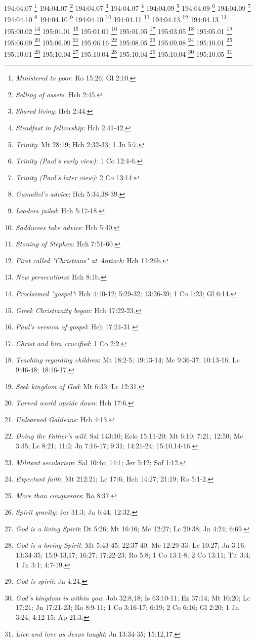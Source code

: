 194:04.07 \footnote{\textit{Ministered to poor}: Ro 15:26; Gl 2:10.}
194:04.07 \footnote{\textit{Selling of assets}: Hch 2:45.}
194:04.07 \footnote{\textit{Shared living}: Hch 2:44.}
194:04.07 \footnote{\textit{Steadfast in fellowship}: Hch 2:41-42.}
194:04.09 \footnote{\textit{Trinity}: Mt 28:19; Hch 2:32-33; 1 Jn 5:7.}
194:04.09 \footnote{\textit{Trinity (Paul's early view)}: 1 Co 12:4-6.}
194:04.09 \footnote{\textit{Trinity (Paul's later view)}: 2 Co 13:14.}
194:04.10 \footnote{\textit{Gamaliel's advice}: Hch 5:34,38-39.}
194:04.10 \footnote{\textit{Leaders jailed}: Hch 5:17-18.}
194:04.10 \footnote{\textit{Sadducees take advice}: Hch 5:40.}
194:04.11 \footnote{\textit{Stoning of Stephen}: Hch 7:51-60.}
194:04.13 \footnote{\textit{First called "Christians" at Antioch}: Hch 11:26b.}
194:04.13 \footnote{\textit{New persecutions}: Hch 8:1b.}
195:00.02 \footnote{\textit{Proclaimed "gospel"}: Hch 4:10-12; 5:29-32; 13:26-39; 1 Co 1:23; Gl 6:14.}
195:01.01 \footnote{\textit{Greek Christianity began}: Hch 17:22-23.}
195:01.01 \footnote{\textit{Paul's version of gospel}: Hch 17:24-31.}
195:01.05 \footnote{\textit{Christ and him crucified}: 1 Co 2:2.}
195:03.05 \footnote{\textit{Teaching regarding children}: Mt 18:2-5; 19:13-14; Mc 9:36-37; 10:13-16; Lc 9:46-48; 18:16-17.}
195:05.01 \footnote{\textit{Seek kingdom of God}: Mt 6:33; Lc 12:31.}
195:06.09 \footnote{\textit{Turned world upside down}: Hch 17:6.}
195:06.09 \footnote{\textit{Unlearned Galileans}: Hch 4:13.}
195:06.16 \footnote{\textit{Doing the Father's will}: Sal 143:10; Eclo 15:11-20; Mt 6:10; 7:21; 12:50; Mc 3:35; Lc 8:21; 11:2; Jn 7:16-17; 9:31; 14:21-24; 15:10,14-16.}
195:08.05 \footnote{\textit{Militant secularism}: Sal 10:4c; 14:1; Jer 5:12; Sof 1:12.}
195:09.08 \footnote{\textit{Expectant faith}: Mt 212:21; Lc 17:6; Hch 14:27; 21:19; Ro 5:1-2.}
195:10.01 \footnote{\textit{More than conquerors}: Ro 8:37.}
195:10.01 \footnote{\textit{Spirit gravity}: Jer 31:3; Jn 6:44; 12:32.}
195:10.04 \footnote{\textit{God is a living Spirit}: Dt 5:26; Mt 16:16; Mc 12:27; Lc 20:38; Jn 4:24; 6:69.}
195:10.04 \footnote{\textit{God is a loving Spirit}: Mt 5:43-45; 22:37-40; Mc 12:29-33; Lc 10:27; Jn 3:16; 13:34-35; 15:9-13,17; 16:27; 17:22-23; Ro 5:8; 1 Co 13:1-8; 2 Co 13:11; Tit 3:4; 1 Jn 3:1; 4:7-19.}
195:10.04 \footnote{\textit{God is spirit}: Jn 4:24.}
195:10.04 \footnote{\textit{God's kingdom is within you}: Job 32:8,18; Is 63:10-11; Ez 37:14; Mt 10:20; Lc 17:21; Jn 17:21-23; Ro 8:9-11; 1 Co 3:16-17; 6:19; 2 Co 6:16; Gl 2:20; 1 Jn 3:24; 4:12-15; Ap 21:3.}
195:10.05 \footnote{\textit{Live and love as Jesus taught}: Jn 13:34-35; 15:12,17.}
